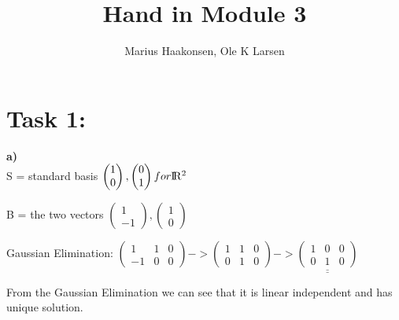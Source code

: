 \documentclass[11pt]{amsart}
\title{Hand in Module 3}
\author{Marius Haakonsen, Ole K Larsen}
\begin{document}
\maketitle

\section{Task 1:}

\textbf{a)}\\

S = standard basis $\begin{pmatrix} 1 \\ 0 \end{pmatrix} , \begin{pmatrix} 0 \\ 1 \end{pmatrix} for  {\rm I\!R^2}$


B = the two vectors $\begin{pmatrix} 1 \\ -1 \end{pmatrix} , \begin{pmatrix} 1 \\ 0 \end{pmatrix}$ 


Gaussian Elimination: $\begin{pmatrix} 1&1&0 \\ -1&0&0 \end{pmatrix} -> 
						\begin{pmatrix} 1&1&0 \\ 0&1&0 \end{pmatrix} ->
						\underline{\underline{\begin{pmatrix} 1&0&0 \\ 0&1&0 \end{pmatrix}}} $

From the Gaussian Elimination we can see that it is linear independent and has unique solution.
\end{document}
